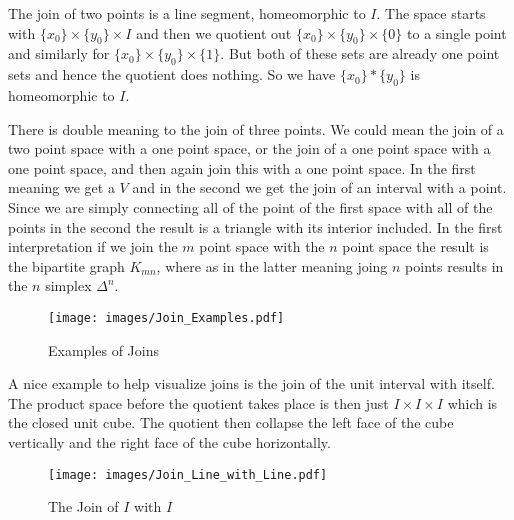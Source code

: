         \begin{example}
            The join of two points is a line segment, homeomorphic to
            $I$. The space starts with
            $\{x_{0}\}\times\{y_{0}\}\times{I}$ and then we quotient out
            $\{x_{0}\}\times\{y_{0}\}\times\{0\}$ to a single point and
            similarly for $\{x_{0}\}\times\{y_{0}\}\times\{1\}$. But
            both of these sets are already one point sets and hence the
            quotient does nothing. So we have $\{x_{0}\}*\{y_{0}\}$ is
            homeomorphic to $I$.
        \end{example}
        \begin{example}
            There is double meaning to the join of three points. We
            could mean the join of a two point space with a one point
            space, or the join of a one point space with a one point
            space, and then again join this with a one point space.
            In the first meaning we get a $V$ and in the second we get
            the join of an interval with a point. Since we are simply
            connecting all of the point of the first space with all of
            the points in the second the result is a triangle with its
            interior included. In the first interpretation if we join
            the $m$ point space with the $n$ point space the result is
            the bipartite graph $K_{mn}$, where as in the latter meaning
            joing $n$ points results in the $n$ simplex $\Delta^{n}$.
        \end{example}
        \begin{figure}[H]
            \centering
            \captionsetup{type=figure}
            \texttt{[image: images/Join\_Examples.pdf]}
            \caption{Examples of Joins}
            \label{fig:Join_Examples}
        \end{figure} 
        \begin{example}
            A nice example to help visualize joins is the join of the
            unit interval with itself. The product space before the
            quotient takes place is then just $I\times{I}\times{I}$
            which is the closed unit cube. The quotient then collapse
            the left face of the cube vertically and the right face of
            the cube horizontally.
        \end{example}
        \begin{figure}
            \centering
            \captionsetup{type=figure}
            \texttt{[image: images/Join\_Line\_with\_Line.pdf]}
            \caption{The Join of $I$ with $I$}
            \label{fig:Join_Line_with_Line}
        \end{figure}
